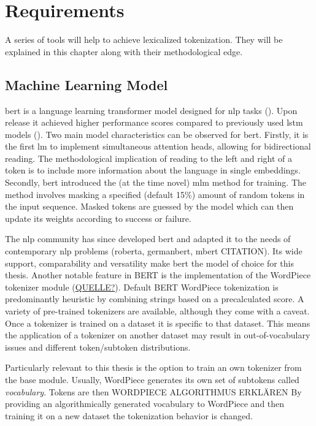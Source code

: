 \documentclass[english]{ttlab-qualify}
\begin{document}
    \section{Requirements}
    \label{sec:requirements}
    A series of tools will help to achieve lexicalized tokenization.
    They will be explained in this chapter along with their methodological edge.

    \subsection{Machine Learning Model}
    \label{subsec:mlm}

    \ac{bert} is a language learning transformer model designed for \ac{nlp} tasks (\cite{ATTENTION}).
    Upon release it achieved higher performance scores compared to previously used \ac{lstm} models (\cite{BERTHIGH1}).
    Two main model characteristics can be observed for \ac{bert}.
    Firstly, it is the first \ac{lm} to implement simultaneous attention heads, allowing for bidirectional reading.
    The methodological implication of reading to the left and right of a token is to include more information about the language in single embeddings.
    Secondly, \ac{bert} introduced the (at the time novel) \ac{mlm} method for training.
    The method involves masking a specified (default 15\%) amount of random tokens in the input sequence.
    Masked tokens are guessed by the model which can then update its weights according to success or failure.

    The \ac{nlp} community has since developed \ac{bert} and adapted it to the needs of contemporary \ac{nlp} problems (roberta, germanbert, mbert \uppercase{citation}).
    Its wide support, comparability and versatility make \ac{bert} the model of choice for this thesis.
    Another notable feature in \uppercase{bert} is the implementation of the WordPiece tokenizer module (\uppercase{\href{https://huggingface.co/course/chapter6/6?fw=pt}{quelle?}}).
    Default BERT WordPiece tokenization is predominantly heuristic by combining strings based on a precalculated score.
    A variety of pre-trained tokenizers are available, although they come with a caveat.
    Once a tokenizer is trained on a dataset it is specific to that dataset.
    This means the application of a tokenizer on another dataset may result in out-of-vocabulary issues and different token/subtoken distributions.

    Particularly relevant to this thesis is the option to train an own tokenizer from the base module.
    Usually, WordPiece generates its own set of subtokens called \textit{vocabulary}.
    Tokens are then \uppercase{WORDPIECE algorithmus erklären}
    By providing an algorithmically generated vocabulary to WordPiece and then training it on a new dataset the tokenization behavior is changed.
\end{document}
